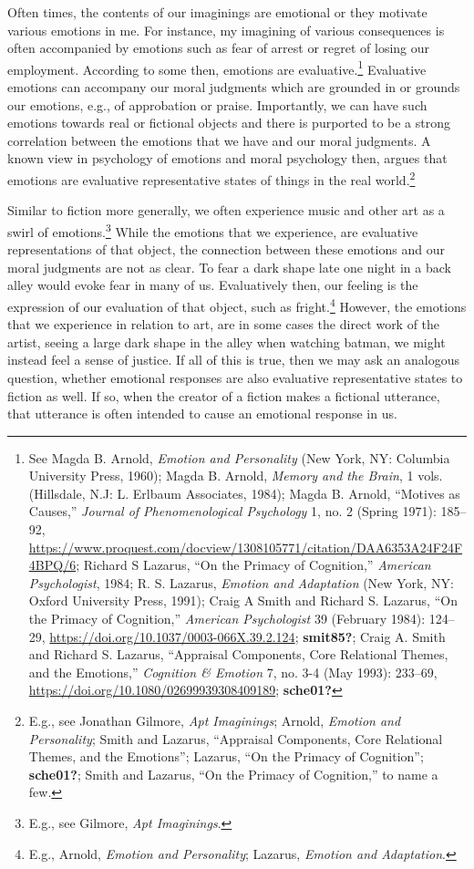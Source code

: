 \documentclass[phdthesis,12pt,final]{wuthesis}
\theoremstyle{definition}
\theoremstyle{definition}
\theoremstyle{definition}
\theoremstyle{definition}
\theoremstyle{remark}
\begin{document}
Often times, the contents of our imaginings are emotional or they motivate various emotions in me. For instance, my imagining of various consequences is often accompanied by emotions such as fear of arrest or regret of losing our employment. According to some then, emotions are evaluative.\footnote{See Magda B. Arnold, \emph{Emotion and {Personality}} (New York, NY: Columbia University Press, 1960); Magda B. Arnold, \emph{Memory and the Brain}, 1 vols. (Hillsdale, N.J: L. Erlbaum Associates, 1984); Magda B. Arnold, {``Motives as Causes,''} \emph{Journal of Phenomenological Psychology} 1, no. 2 (Spring 1971): 185--92, \url{https://www.proquest.com/docview/1308105771/citation/DAA6353A24F24F4BPQ/6}; Richard S Lazarus, {``On the {Primacy} of {Cognition},''} \emph{American Psychologist}, 1984; R. S. Lazarus, \emph{Emotion and Adaptation} (New York, NY: Oxford University Press, 1991); Craig A Smith and Richard S. Lazarus, {``On the {Primacy} of {Cognition},''} \emph{American Psychologist} 39 (February 1984): 124--29, \url{https://doi.org/10.1037/0003-066X.39.2.124}; \textbf{smit85?}; Craig A. Smith and Richard S. Lazarus, {``Appraisal {Components}, {Core Relational Themes}, and the {Emotions},''} \emph{Cognition \& Emotion} 7, no. 3-4 (May 1993): 233--69, \url{https://doi.org/10.1080/02699939308409189}; \textbf{sche01?}} Evaluative emotions can accompany our moral judgments which are grounded in or grounds our emotions, e.g., of approbation or praise. Importantly, we can have such emotions towards real or fictional objects and there is purported to be a strong correlation between the emotions that we have and our moral judgments. A known view in psychology of emotions and moral psychology then, argues that emotions are evaluative representative states of things in the real world.\footnote{E.g., see Jonathan Gilmore, \emph{Apt {Imaginings}}; Arnold, \emph{Emotion and {Personality}}; Smith and Lazarus, {``Appraisal {Components}, {Core Relational Themes}, and the {Emotions}''}; Lazarus, {``On the {Primacy} of {Cognition}''}; \textbf{sche01?}; Smith and Lazarus, {``On the {Primacy} of {Cognition},''} to name a few.}

Similar to fiction more generally, we often experience music and other art as a swirl of emotions.\footnote{E.g., see Gilmore, \emph{Apt {Imaginings}}.} While the emotions that we experience, are evaluative representations of that object, the connection between these emotions and our moral judgments are not as clear. To fear a dark shape late one night in a back alley would evoke fear in many of us. Evaluatively then, our feeling is the expression of our evaluation of that object, such as fright.\footnote{E.g., Arnold, \emph{Emotion and {Personality}}; Lazarus, \emph{Emotion and Adaptation}.} However, the emotions that we experience in relation to art, are in some cases the direct work of the artist, seeing a large dark shape in the alley when watching batman, we might instead feel a sense of justice. If all of this is true, then we may ask an analogous question, whether emotional responses are also evaluative representative states to fiction as well. If so, when the creator of a fiction makes a fictional utterance, that utterance is often intended to cause an emotional response in us.
\end{document}
